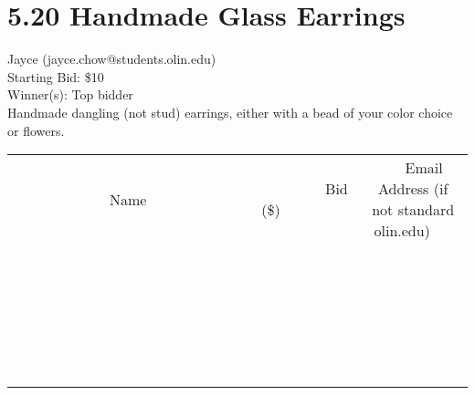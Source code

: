 \documentclass[11pt]{article}
\begin{document}
\section*{5.20 Handmade Glass Earrings}
Jayce (jayce.chow@students.olin.edu) \\
Starting Bid: \$10 \\
Winner(s): 
Top bidder \\
Handmade dangling (not stud) earrings, either with a bead of your color choice or flowers. \\[6ex]
\begin{tabular}{c c c}
~~~~~~~~~~~~~Name~~~~~~~~~~~~~ & ~~~~~~~~~Bid (\$)~~~~~~~~~ & ~~~Email Address (if not standard olin.edu)~~~ \\
 & & \\
\hline
 & & \\
\hline
 & & \\
\hline
 & & \\
\hline
 & & \\
\hline
 & & \\
\hline
 & & \\
\hline
 & & \\
\hline
 & & \\
\hline
 & & \\
\hline
 & & \\
\hline
 & & \\
\hline
 & & \\
\hline
 & & \\
\hline
 & & \\
\hline
 & & \\
\hline
 & & \\
\hline
 & & \\
\hline
 & & \\
\hline
 & & \\
\hline
 & & \\
\hline
 & & \\
\hline
 & & \\
\hline
 & & \\
\hline
 & & \\
\hline
 & & \\
\hline
\end{tabular}
\clearpage
\end{document}

